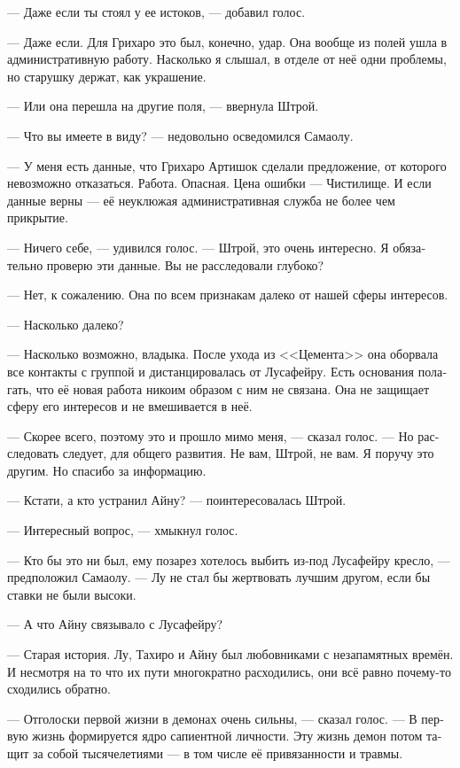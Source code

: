 \documentclass[a4paper,12pt,fleqn]{book}\usepackage{cooltooltips}\usepackage{polyglossia}\setdefaultlanguage[babelshorthands=true]{russian}\setotherlanguage{english}\defaultfontfeatures{Ligatures=TeX,Mapping=tex-text} \usepackage{xcolor}\definecolor{lightgray}{HTML}{bbbbbb}\color{lightgray}\newcommand{\ml}[3]{\textenglish{\textcolor{black}{#3}}}
\begin{document}
{--- Даже если ты стоял у ее истоков, --- добавил голос.

--- Даже если.
Для Грихаро это был, конечно, удар.
Она вообще из полей ушла в административную работу.
Насколько я слышал, в отделе от неё одни проблемы, но старушку держат, как украшение.

--- Или она перешла на другие поля, --- ввернула Штрой.

--- Что вы имеете в виду? --- недовольно осведомился Самаолу.

--- У меня есть данные, что Грихаро Артишок сделали предложение, от которого невозможно отказаться.
Работа.
Опасная.
Цена ошибки --- Чистилище.
И если данные верны --- её неуклюжая административная служба не более чем прикрытие.

--- Ничего себе, --- удивился голос.
--- Штрой, это очень интересно.
Я обязательно проверю эти данные.
Вы не расследовали глубоко?

--- Нет, к сожалению.
Она по всем признакам далеко от нашей сферы интересов.

--- Насколько далеко?

--- Насколько возможно, владыка.
После ухода из <<Цемента>> она оборвала все контакты с группой и дистанцировалась от Лусафейру.
Есть основания полагать, что её новая работа никоим образом с ним не связана.
Она не защищает сферу его интересов и не вмешивается в неё.

--- Скорее всего, поэтому это и прошло мимо меня, --- сказал голос.
--- Но расследовать следует, для общего развития.
Не вам, Штрой, не вам.
Я поручу это другим.
Но спасибо за информацию.

--- Кстати, а кто устранил Айну? --- поинтересовалась Штрой.

--- Интересный вопрос, --- хмыкнул голос.

--- Кто бы это ни был, ему позарез хотелось выбить из-под Лусафейру кресло, --- предположил Самаолу.
--- Лу не стал бы жертвовать лучшим другом, если бы ставки не были высоки.

--- А что Айну связывало с Лусафейру?

--- Старая история.
Лу, Тахиро и Айну был любовниками с незапамятных времён.
И несмотря на то что их пути многократно расходились, они всё равно почему-то сходились обратно.

--- Отголоски первой жизни в демонах очень сильны, --- сказал голос.
--- В первую жизнь формируется ядро сапиентной личности.
Эту жизнь демон потом тащит за собой тысячелетиями --- в том числе её привязанности и травмы.

}
\end{document}
